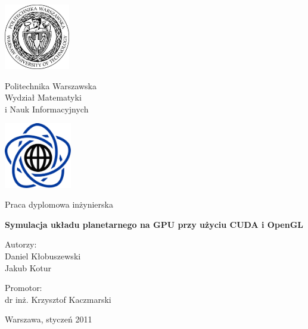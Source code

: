 \thispagestyle{empty}
\begin{center}
\Large

\begin{minipage}{0.2\linewidth}
\centering
\includegraphics[height=2.86cm]{img/logo_pw.pdf}
\end{minipage}
\begin{minipage}{0.55\linewidth}
\centering
Politechnika Warszawska \\[0.5em] Wydział Matematyki \\ i Nauk Informacyjnych
\end{minipage}
\begin{minipage}{0.2\linewidth}
\centering
\includegraphics[height=2.86cm]{img/logo_mini.pdf}
\end{minipage}

\vspace{2em}
Praca dyplomowa inżynierska
\vspace{5em}

\huge
\textbf{Symulacja układu planetarnego na GPU przy użyciu CUDA i OpenGL}

\large

\vspace{4em}

\hfill
\begin{minipage}{0.4\linewidth}
Autorzy:
\vspace{0.5em}
\\
Daniel Kłobuszewski
\\
Jakub Kotur

\vspace{1em}

Promotor:
\vspace{0.5em}
\\
dr inż. Krzysztof Kaczmarski
\end{minipage}

\vfill
Warszawa, styczeń 2011
\end{center}
